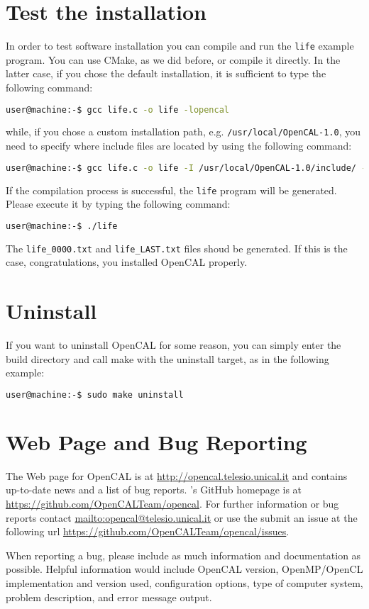 \section{Test the installation}

In order to test software installation you can compile and run the
\verb'life' example program. You can use CMake, as we did before, or
compile it directly. In the latter case, if you chose the default
installation, it is sufficient to type the following command:
\begin{lstlisting}[numbers=none,language=bash,label={ch:quickstart:gcc}]
  user@machine:-$ gcc life.c -o life -lopencal
\end{lstlisting}
while, if you chose a custom installation path, e.g. \verb'/usr/local/OpenCAL-1.0', you need to specify where include files are located by using the following command:
\begin{lstlisting}[numbers=none,language=bash,label={ch:quickstart:gcc-full}]
  user@machine:-$ gcc life.c -o life -I /usr/local/OpenCAL-1.0/include/ -lopencal
\end{lstlisting}

If the compilation process is successful, the \verb'life' program will be
generated. Please execute it by typing the following command:
\begin{lstlisting}[numbers=none,language=bash,label={ch:quickstart:gcc}]
  user@machine:-$ ./life
\end{lstlisting}
The \verb'life_0000.txt' and \verb'life_LAST.txt' files shoud be
generated. If this is the case, congratulations, you installed
OpenCAL properly.

\section{Uninstall}

If you want to uninstall OpenCAL for some reason, you can simply enter
the build directory and call make with the uninstall target, as in the
following example:

\begin{lstlisting}[numbers=none,language=bash,label={ch:quickstart:sudouninstall}]
  user@machine:-$ sudo make uninstall
\end{lstlisting}

\section{Web Page and Bug Reporting}

The Web page for OpenCAL is at \url{http://opencal.telesio.unical.it} and
contains up-to-date news and a list of bug reports. \ocal's GitHub
homepage is at \url{https://github.com/OpenCALTeam/opencal}. For
further information or bug reports contact
\url{mailto:opencal@telesio.unical.it} or use the submit an issue at the
following url \url{https://github.com/OpenCALTeam/opencal/issues}.

When reporting a bug, please include as much information and
documentation as possible. Helpful information would include OpenCAL
version, OpenMP/OpenCL implementation and version used,
configuration options, type of computer system, problem description,
and error message output.
